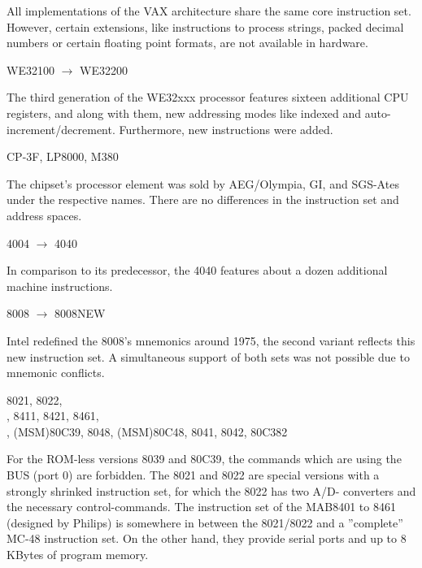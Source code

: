 \documentclass[12pt,twoside]{report}
\begin{document}
All implementations of the VAX architecture share the same
core instruction set.  However, certain extensions, like
instructions to process strings, packed decimal numbers or
certain floating point formats, are not available in hardware.
\begin{cpulist}
   WE32100 $\rightarrow$ WE32200
\end{cpulist}
The third generation of the WE32xxx processor features sixteen
additional CPU registers, and along with them, new addressing
modes like indexed and auto-increment/decrement.  Furthermore,
new instructions were added.
\begin{cpulist}
   CP-3F, LP8000, M380
\end{cpulist}
The chipset's processor element was sold by AEG/Olympia, GI,
and SGS-Ates under the respective names.  There are no differences
in the instruction set and address spaces.
\begin{cpulist}
   4004 $\rightarrow$ 4040
\end{cpulist}
In comparison to its predecessor, the 4040 features about a dozen
additional machine instructions.
\begin{cpulist}
   8008 $\rightarrow$ 8008NEW
\end{cpulist}
Intel redefined the 8008's mnemonics around 1975, the second variant reflects
this new instruction set.  A simultaneous support of both sets was not
possible due to mnemonic conflicts.
\begin{cpulist}
   8021, 8022, \\
, 8411, 8421, 8461, \\
, (MSM)80C39, 8048, (MSM)80C48, 8041, 8042, 80C382
\end{cpulist}
For the ROM-less versions 8039 and 80C39, the commands which are
using the BUS (port 0) are forbidden.  The 8021 and 8022 are special
versions with a strongly shrinked instruction set, for which the 8022
has two A/D- converters and the necessary control-commands.  The 
instruction set of the MAB8401 to 8461 (designed by Philips) is
somewhere in between the 8021/8022 and a ''complete'' MC-48 instruction
set.  On the other hand, they provide serial ports and up to 8 KBytes
of program memory.
\end{document}
